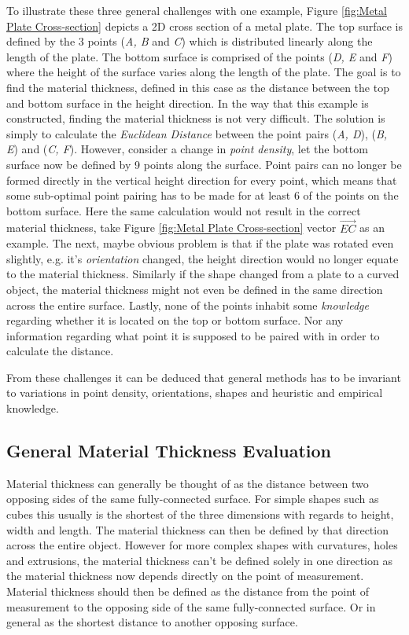 \documentclass[%
]{USN-MSc}
\begin{document}
To illustrate these three general challenges with one example, Figure  \ref{fig:Metal Plate Cross-section} depicts a 2D cross section of a metal plate. The top surface is defined by the 3 points (\textit{A, B} and \textit{C}) which is distributed linearly along the length of the plate. The bottom surface is comprised of the points (\textit{D, E} and \textit{F}) where the height of the surface varies along the length of the plate. The goal is to find the material thickness, defined in this case as the distance between the top and bottom surface in the height direction. In the way that this example is constructed, finding the material thickness is not very difficult. The solution is simply to calculate the \textit{Euclidean Distance} between the point pairs (\textit{A, D}), (\textit{B, E}) and (\textit{C, F}). However, consider a change in \textit{point density}, let the bottom surface now be defined by 9 points along the surface. Point pairs can no longer be formed directly in the vertical height direction for every point, which means that some sub-optimal point pairing has to be made for at least 6 of the points on the bottom surface. Here the same calculation would not result in the correct material thickness, take Figure \ref{fig:Metal Plate Cross-section} vector \( \vec{EC}\) as an example. The next, maybe obvious problem is that if the plate was rotated even slightly, e.g. it's \textit{orientation} changed, the height direction would no longer equate to the material thickness. Similarly if the shape changed from a plate to a curved object, the material thickness might not even be defined in the same direction across the entire surface. Lastly, none of the points inhabit some \textit{knowledge} regarding whether it is located on the top or bottom surface. Nor any information regarding what point it is supposed to be paired with in order to calculate the distance.

From these challenges it can be deduced that general methods has to be invariant to variations in point density, orientations, shapes and heuristic and empirical knowledge.\clearpage

\subsection{General Material Thickness Evaluation}
\label{sub:Material Thickness}
Material thickness can generally be thought of as the distance between two opposing sides of the same fully-connected surface. For simple shapes such as cubes this usually is the shortest of the three dimensions with regards to height, width and length. The material thickness can then be defined by that direction across the entire object. However for more complex shapes with curvatures, holes and extrusions, the material thickness can't be defined solely in one direction as the material thickness now depends directly on the point of measurement. Material thickness should then be defined as the distance from the point of measurement to the opposing side of the same fully-connected surface. Or in general as the shortest distance to another opposing surface.
\end{document}
